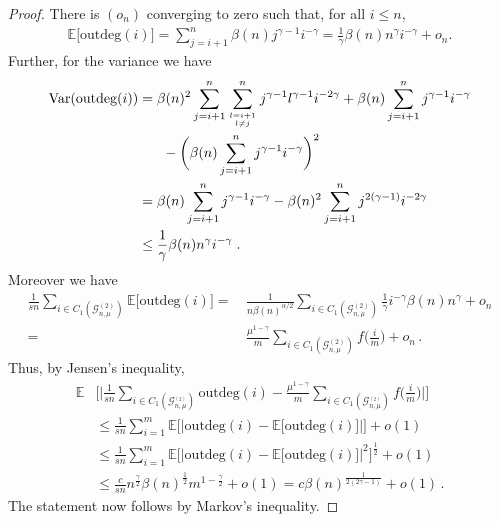 \documentclass[12pt,a4paper]{article}
\newcommand{\Var}{\operatorname{Var}}
\numberwithin{equation}{section}
\begin{document}
\begin{proof}
   There is $(o_n)$ converging to zero such that, for all $i\le n$,
\begin{align*}
    \mathbb{E}\big[\text{outdeg}(i)\big]=\sum_{j=i+1}^n \beta(n) j^{\gamma-1} i^{-\gamma} = \frac1\gamma \beta(n) n^\gamma i^{-\gamma} +o_n.
\end{align*}
Further, for the variance we have 
\begin{equation}\label{varj}
    \begin{aligned}
    \Var(\text{outdeg}(i)) & = \beta(n)^2\sum_{j=i+1}^n\sum_{l=i+1 \atop l\neq j}^n j^{\gamma-1} l^{\gamma-1}i^{-2\gamma}+ \beta(n)\sum_{j=i+1}^n j^{\gamma-1} i^{-\gamma} \\ & \phantom{xxx} - \bigg( \beta(n) \sum_{j=i+1}^n  j^{\gamma-1}i^{-\gamma}\bigg)^2\\ & = \beta(n)\sum_{j=i+1}^n j^{\gamma-1} i^{-\gamma} -\beta(n)^2 \sum_{j=i+1}^n  j^{2(\gamma-1)} i^{-2\gamma}
    \\ & \le  \frac{1}{\gamma} \beta(n) n^\gamma i^{-\gamma} \;.
\end{aligned}
\end{equation}
Moreover we have
\begin{equation*}
\begin{aligned}
    \frac{1}{sn} \sum_{i\in C_1(\mathcal G_{n,\mu}^{(2)})} \mathbb{E}\big[\text{outdeg}(i)\big] = &\, \frac{1}{n\beta(n)^{\alpha/2}} \sum_{i\in C_1(\mathcal G_{n,\mu}^{(2)})} \frac{1}{{\gamma}}i^{-\gamma}\beta(n) n^{\gamma} +o_n
    \\ = & \, \frac{\mu^{1-\gamma}}{m}\sum_{i\in C_1(\mathcal G_{n,\mu}^{(2)})} f \big(\frac{i}{m }\big)+o_n\,.
\end{aligned}
\end{equation*}
Thus, by Jensen's inequality,
\begin{align*}
       \mathbb E & \Big[\Big|\frac{1}{sn}\sum_{i\in C_1(\mathcal G_{n,\mu}^{_{(2)}})} \text{outdeg}(i)-\frac{\mu^{1-\gamma}}{m}\sum_{i\in C_1(\mathcal G_{n,\mu}^{_{(2)}})}f\big(\frac{i}{m}\big) \Big| \Big]
      \\ & \le  \frac{1}{sn}\sum_{i=1}^m \mathbb E \Big[\big|\text{outdeg}(i)-\mathbb E\big[\text{outdeg}(i)\big]\big|\Big] +o(1)
       \\ & \le  \frac{1}{sn}\sum_{i=1}^m \mathbb E \Big[\big|\text{outdeg}(i)-\mathbb E\big[\text{outdeg}(i)\big]\big|^2\Big] ^{\tfrac{1}{2}} + o(1)
       \\ & \le  \frac{c}{sn} n^{\tfrac{\gamma}{2}}\beta(n)^{\tfrac{1}{2}}m^{1-\tfrac{\gamma}{2}}+o(1) = c \beta(n)^{\tfrac{1}{2(2\gamma-1)}}+o(1) \,.
\end{align*}
The statement now follows by Markov's inequality.
\end{proof}
\end{document}
